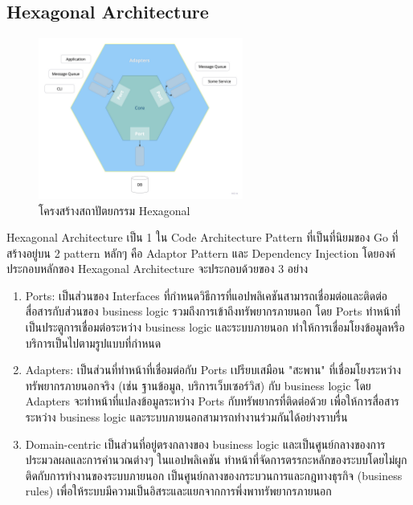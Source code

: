   \subsection{Hexagonal Architecture}
    \begin{figure}[!h]
      \centering
      \includegraphics[width=0.6\textwidth]{image/Background/hex.png}
      \caption[Hexagonal Architecture]{โครงสร้างสถาปัตยกรรม Hexagonal}
      \label{fig:hex_pic}
    \end{figure}
    \FloatBarrier
    \qquad Hexagonal Architecture เป็น 1 ใน Code Architecture Pattern ที่เป็นที่นิยมของ Go ที่สร้างอยู่บน 2 pattern หลักๆ คือ Adaptor Pattern และ Dependency Injection  โดยองค์ประกอบหลักของ Hexagonal Architecture จะประกอบด้วยของ 3 อย่าง \cite{Hexagonal1}\cite{Hexagonal2}
    \begin{enumerate}
      \item Ports: เป็นส่วนของ Interfaces ที่กำหนดวิธีการที่แอปพลิเคชันสามารถเชื่อมต่อและติดต่อสื่อสารกับส่วนของ business logic รวมถึงการเข้าถึงทรัพยากรภายนอก โดย Ports ทำหน้าที่เป็นประตูการเชื่อมต่อระหว่าง business logic และระบบภายนอก ทำให้การเชื่อมโยงข้อมูลหรือบริการเป็นไปตามรูปแบบที่กำหนด\
      \item Adapters: เป็นส่วนที่ทำหน้าที่เชื่อมต่อกับ Ports เปรียบเสมือน "สะพาน" ที่เชื่อมโยงระหว่างทรัพยากรภายนอกจริง (เช่น ฐานข้อมูล, บริการเว็บเซอร์วิส) กับ business logic โดย Adapters จะทำหน้าที่แปลงข้อมูลระหว่าง Ports กับทรัพยากรที่ติดต่อด้วย เพื่อให้การสื่อสารระหว่าง business logic และระบบภายนอกสามารถทำงานร่วมกันได้อย่างราบรื่น
      \item Domain-centric เป็นส่วนที่อยู่ตรงกลางของ business logic และเป็นศูนย์กลางของการประมวลผลและการคำนวณต่างๆ ในแอปพลิเคชัน ทำหน้าที่จัดการตรรกะหลักของระบบโดยไม่ผูกติดกับการทำงานของระบบภายนอก เป็นศูนย์กลางของกระบวนการและกฎทางธุรกิจ (business rules) เพื่อให้ระบบมีความเป็นอิสระและแยกจากการพึ่งพาทรัพยากรภายนอก
    \end{enumerate}
